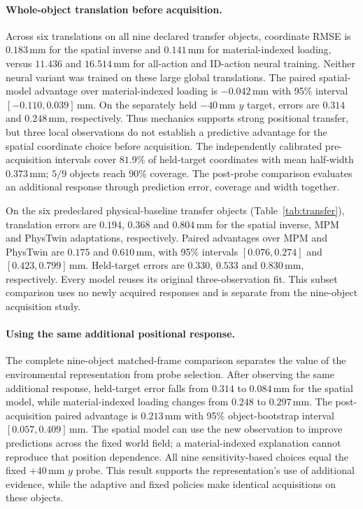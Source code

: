 



\paragraph{Whole-object translation before acquisition.}
Across six translations on all nine declared transfer objects, coordinate RMSE is $0.183$\,mm for the spatial inverse and $0.141$\,mm for material-indexed loading, versus $11.436$ and $16.514$\,mm for all-action and ID-action neural training. Neither neural variant was trained on these large global translations. The paired spatial-model advantage over material-indexed loading is $-0.042$\,mm with 95\% interval $[-0.110,0.039]$\,mm. On the separately held $-40$\,mm $y$ target, errors are $0.314$ and $0.248$\,mm, respectively. Thus mechanics supports strong positional transfer, but three local observations do not establish a predictive advantage for the spatial coordinate choice before acquisition. The independently calibrated pre-acquisition intervals cover $81.9\%$ of held-target coordinates with mean half-width $0.373$\,mm; $5/9$ objects reach $90\%$ coverage. The post-probe comparison evaluates an additional response through prediction error, coverage and width together.

On the six predeclared physical-baseline transfer objects (Table~\ref{tab:transfer}), translation errors are $0.194$, $0.368$ and $0.804$\,mm for the spatial inverse, MPM and PhysTwin adaptations, respectively. Paired advantages over MPM and PhysTwin are $0.175$ and $0.610$\,mm, with 95\% intervals $[0.076,0.274]$ and $[0.423,0.799]$\,mm. Held-target errors are $0.330$, $0.533$ and $0.830$\,mm, respectively. Every model reuses its original three-observation fit. This subset comparison uses no newly acquired responses and is separate from the nine-object acquisition study.



\paragraph{Using the same additional positional response.}
The complete nine-object matched-frame comparison separates the value of the environmental representation from probe selection. After observing the same additional response, held-target error falls from $0.314$ to $0.084$\,mm for the spatial model, while material-indexed loading changes from $0.248$ to $0.297$\,mm. The post-acquisition paired advantage is $0.213$\,mm with 95\% object-bootstrap interval $[0.057,0.409]$\,mm. The spatial model can use the new observation to improve predictions across the fixed world field; a material-indexed explanation cannot reproduce that position dependence. All nine sensitivity-based choices equal the fixed $+40$\,mm $y$ probe. This result supports the representation's use of additional evidence, while the adaptive and fixed policies make identical acquisitions on these objects.

